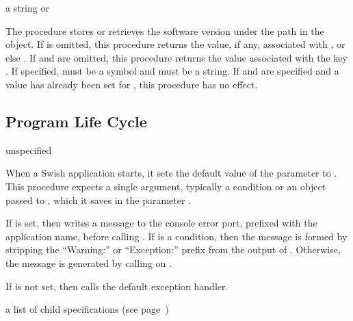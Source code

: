 \begin{parameter}
\end{parameter}
\hasvalue{} a string or 

The  procedure stores or retrieves the software
version under the path  in the
 object.
If  is omitted, this procedure returns the value, if any,
associated with , or else .
If  and  are omitted, this procedure returns the value
associated with the key .
If specified,  must be a symbol and  must be a string.
If  and  are specified and a value has already been
set for , this procedure has no effect.

\subsection{Program Life Cycle}

\begin{procedure}
\end{procedure}
\returns{} unspecified

When a Swish application starts, it sets the default value of the
 parameter to .
This procedure expects a single argument, typically a condition or an object
passed to , which it saves in the parameter .

If  is set, then  writes a
message to the console error port, prefixed with the application name,
before calling .
If  is a condition, then the message is formed by stripping the
``Warning:'' or ``Exception:'' prefix from the output of .
Otherwise, the message is generated by calling
on .

If  is not set, then 
calls the default exception handler.

\begin{parameter}
\end{parameter}
\hasvalue{} a list of child specifications (see page~\pageref{page:child-spec})

